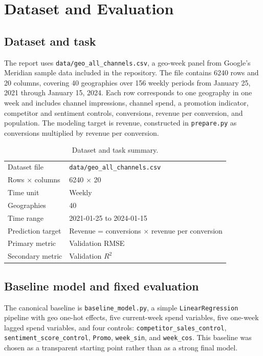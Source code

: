 \documentclass{article}
\begin{document}
\section{Dataset and Evaluation}

\subsection{Dataset and task}

The report uses \texttt{data/geo\_all\_channels.csv}, a geo-week panel from Google's Meridian sample data included in the repository. The file contains 6240 rows and 20 columns, covering 40 geographies over 156 weekly periods from January 25, 2021 through January 15, 2024. Each row corresponds to one geography in one week and includes channel impressions, channel spend, a promotion indicator, competitor and sentiment controls, conversions, revenue per conversion, and population. The modeling target is revenue, constructed in \texttt{prepare.py} as conversions multiplied by revenue per conversion.

\begin{table}[t]
\centering
\caption{Dataset and task summary.}
\label{tab:data-summary}
\begin{tabular}{ll}
\toprule
Dataset file & \texttt{data/geo\_all\_channels.csv} \\
Rows $\times$ columns & 6240 $\times$ 20 \\
Time unit & Weekly \\
Geographies & 40 \\
Time range & 2021-01-25 to 2024-01-15 \\
Prediction target & Revenue = conversions $\times$ revenue per conversion \\
Primary metric & Validation RMSE \\
Secondary metric & Validation $R^2$ \\
\bottomrule
\end{tabular}
\end{table}

\subsection{Baseline model and fixed evaluation}

The canonical baseline is \texttt{baseline\_model.py}, a simple \texttt{LinearRegression} pipeline with geo one-hot effects, five current-week spend variables, five one-week lagged spend variables, and four controls: \texttt{competitor\_sales\_control}, \texttt{sentiment\_score\_control}, \texttt{Promo}, \texttt{week\_sin}, and \texttt{week\_cos}. This baseline was chosen as a transparent starting point rather than as a strong final model.
\end{document}
